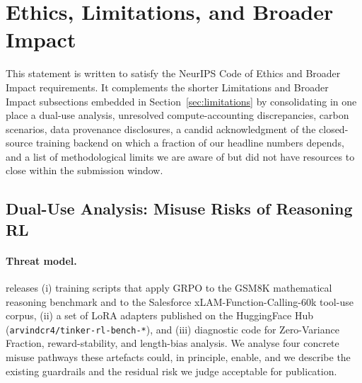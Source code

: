 
\section{Ethics, Limitations, and Broader Impact}
\label{sec:impact_standalone}

This statement is written to satisfy the NeurIPS Code of Ethics and Broader
Impact requirements. It complements the shorter Limitations and Broader
Impact subsections embedded in Section~\ref{sec:limitations} by consolidating
in one place a dual-use analysis, unresolved compute-accounting discrepancies, carbon
scenarios, data provenance disclosures, a candid acknowledgment
of the closed-source training backend on which a fraction of our headline
numbers depends, and a list of methodological limits we are aware of but
did not have resources to close within the submission window.

\subsection{Dual-Use Analysis: Misuse Risks of Reasoning RL}
\label{sec:dualuse}

\paragraph{Threat model.}
\ours{} releases (i) training scripts that apply GRPO to the GSM8K
\cite{cobbe2021training} mathematical reasoning benchmark and to the
Salesforce xLAM-Function-Calling-60k \cite{liu2024xlam} tool-use corpus,
(ii) a set of LoRA adapters published on the HuggingFace Hub
(\texttt{arvindcr4/tinker-rl-bench-*}), and (iii) diagnostic code for
Zero-Variance Fraction, reward-stability, and length-bias analysis. We
analyse four concrete misuse pathways these artefacts could, in principle,
enable, and we describe the existing guardrails and the residual risk we
judge acceptable for publication.

